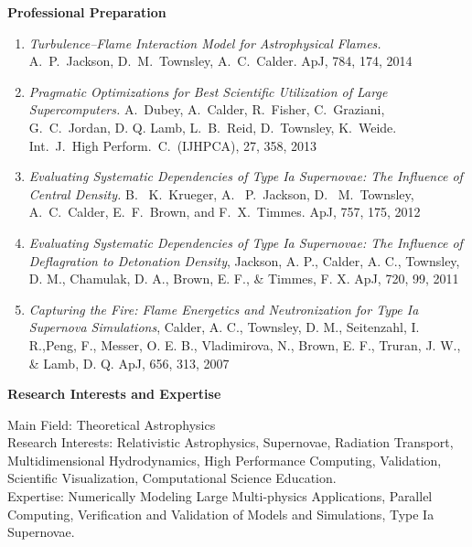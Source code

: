 \documentclass[11pt,letterpaper,english]{article}
\begin{document}
{\begin{flushleft} {\bf Professional Preparation}
\begin{enumerate} \itemsep1pt \parskip0pt 

\item
{\em Turbulence--Flame Interaction Model for Astrophysical Flames.}
A.~P.~Jackson, D.~M.~Townsley, A.~C.~Calder. ApJ, 784, 174, 2014 \\

\item
{\em Pragmatic Optimizations for Best Scientific Utilization of
  Large Supercomputers.}
A.~Dubey, A.~Calder, R.~Fisher, C.~Graziani, G.~C.~Jordan,
D. Q. Lamb, L.~B.~Reid, D.~Townsley, K.~Weide.
Int.\ J.\ High Perform.\ C.\ (IJHPCA), 27, 358, 2013 \\

\item
{\em Evaluating Systematic Dependencies of Type Ia Supernovae:
The Influence of Central Density.}
B.~ K.~Krueger, A.~ P.~Jackson, D.~ M.~Townsley, A.~C.~Calder,
E.~F.~Brown, and F.~X.~Timmes. ApJ, 757, 175, 2012 \\

\item
{\emph{Evaluating Systematic Dependencies of Type Ia Supernovae: The Influence of Deflagration to Detonation Density}},
Jackson, A. P., Calder, A. C., Townsley, D. M., Chamulak, D. A.,  Brown, E. F.,  \& Timmes, F. X. ApJ,
720, 99, 2011 \\

\item {\emph{Capturing the Fire: Flame Energetics and Neutronization for Type Ia Supernova Simulations}},
Calder, A. C., Townsley, D. M., Seitenzahl, I. R.,Peng, F., Messer, O. E. B., Vladimirova, N., Brown, E. F., Truran, J. W.,
\& Lamb, D. Q. ApJ, 656, 313, 2007 \\

\end{enumerate} 

\vspace{-6pt}
{\bf Research Interests and Expertise}
{\parindent 16pt

Main Field: Theoretical Astrophysics \\
Research Interests: Relativistic Astrophysics,
Supernovae, Radiation Transport,
Multidimensional Hydrodynamics, High Performance Computing,
Validation, Scientific Visualization, Computational Science
Education.  \\
Expertise: Numerically Modeling Large Multi-physics Applications, Parallel Computing,
Verification and Validation of Models and Simulations, Type Ia Supernovae.

}
\end{flushleft}}
\end{document}
